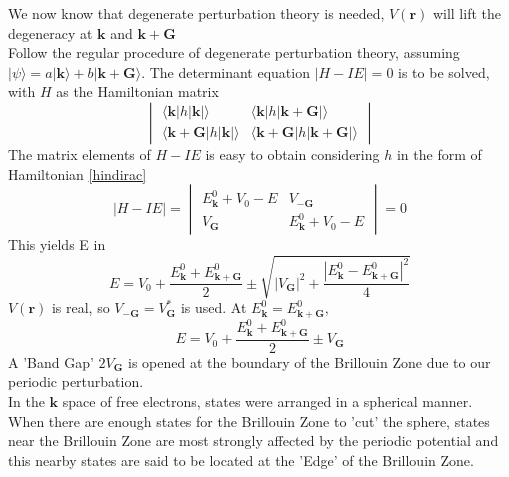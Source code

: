 \documentclass{article}
\begin{document}
We now know that degenerate perturbation theory is needed, $ V(\mathbf{r})$ will lift the degeneracy at $\mathbf{k}$ and $\mathbf{k+G}$\\
Follow the regular procedure of degenerate perturbation theory, assuming $|\psi\rangle=a|\mathbf{k}\rangle+b|\mathbf{k+G}\rangle$. The determinant equation $|H-IE|=0$ is to be solved, with $H$ as the Hamiltonian matrix
$$\begin{vmatrix}
		\langle\mathbf{k}|h|\mathbf{k}|\rangle   & \langle\mathbf{k}|h|\mathbf{k+G}|\rangle   \\
		\langle\mathbf{k+G}|h|\mathbf{k}|\rangle & \langle\mathbf{k+G}|h|\mathbf{k+G}|\rangle
	\end{vmatrix}$$
The matrix elements of $H-IE$ is easy to obtain considering $h$ in the form of Hamiltonian \eqref{hindirac}
$$|H-IE|=\begin{vmatrix}
		E_{\mathbf{k}}^{0}+V_0-E & V_{-\mathbf{G}}          \\
		V_{\mathbf{G}}           & E_{\mathbf{k}}^{0}+V_0-E
	\end{vmatrix}=0$$
This yields E in
$$E=V_0+\frac{E_{\mathbf{k}}^{0}+E_{\mathbf{k+G}}^{0}}{2}\pm\sqrt{|V_{\mathbf{G}}|^2+\frac{|E_{\mathbf{k}}^{0}-E_{\mathbf{k+G}}^{0}|^2}{4}}$$
$V(\mathbf{r})$ is real, so $V_{-\mathbf{G}}=V_{\mathbf{G}}^{*}$ is used. At $E_{\mathbf{k}}^{0}=E_{\mathbf{k+G}}^{0}$,
$$E=V_0+\frac{E_{\mathbf{k}}^{0}+E_{\mathbf{k+G}}^{0}}{2}\pm V_{\mathbf{G}}$$
A 'Band Gap' $2V_{\mathbf{G}}$ is opened at the boundary of the Brillouin Zone due to our periodic perturbation.\\
In the $\mathbf{k}$ space of free electrons, states were arranged in a spherical manner. When there are enough states for the Brillouin Zone to 'cut' the sphere, states near the Brillouin Zone are most strongly affected by the periodic potential and this nearby states are said to be located at the 'Edge' of the Brillouin Zone.\\
\end{document}
